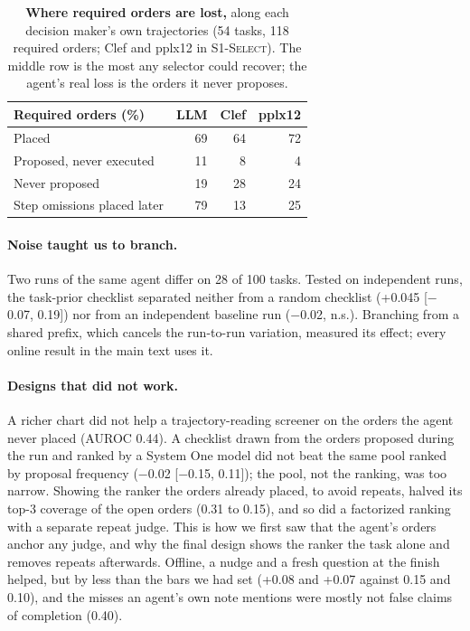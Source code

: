 \documentclass[11pt]{article}
\newcommand{\llm}{\textsc{LLM}}
\newcommand{\sel}{\textsc{S1-Select}}
\begin{document}
\begin{table}[t]
\centering\small
\begin{tabular}{@{}lrrr@{}}\toprule
Required orders (\%) & \llm{} & Clef & pplx12 \\\midrule
Placed & 69 & 64 & 72 \\
Proposed, never executed & 11 & 8 & 4 \\
Never proposed & 19 & 28 & 24 \\\midrule
Step omissions placed later & 79 & 13 & 25 \\\bottomrule
\end{tabular}
\caption{\textbf{Where required orders are lost,} along each decision maker's own trajectories (54 tasks, 118
required orders; Clef and pplx12 in \sel). The middle row is the most any selector could recover; the agent's real
loss is the orders it never proposes.}
\label{tab:ceiling}
\end{table}

\paragraph{Noise taught us to branch.} Two runs of the same agent differ on 28 of 100 tasks. Tested on independent
runs, the task-prior checklist separated neither from a random checklist (+0.045 [$-$0.07, 0.19]) nor from an
independent baseline run ($-$0.02, n.s.). Branching from a shared prefix, which cancels the run-to-run variation,
measured its effect; every online result in the main text uses it.

\paragraph{Designs that did not work.} A richer chart did not help a trajectory-reading screener on the orders the
agent never placed (AUROC 0.44). A checklist drawn from the orders proposed during the run and ranked by a System One model did
not beat the same pool ranked by proposal frequency ($-$0.02 [$-$0.15, 0.11]); the pool, not the ranking, was too
narrow. Showing the ranker the orders already placed, to avoid repeats, halved its top-3
coverage of the open orders (0.31 to 0.15), and so did a factorized ranking with a separate repeat judge. This is how
we first saw that the agent's orders anchor any judge, and why the final design shows the ranker the task alone and
removes repeats afterwards. Offline, a nudge and a fresh question at the finish helped, but by less than the bars we
had set (+0.08 and +0.07 against 0.15 and 0.10), and the misses an agent's own note mentions were mostly not false
claims of completion (0.40).
\end{document}
